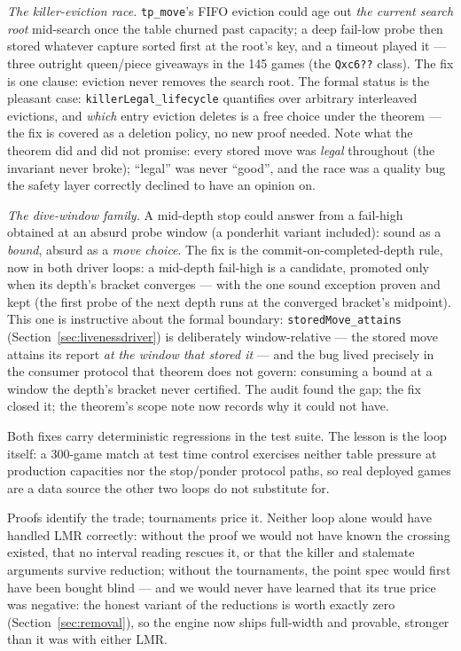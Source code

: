 \documentclass[11pt]{article}
\theoremstyle{plain}
\theoremstyle{definition}
\theoremstyle{remark}
\begin{document}
\emph{The killer-eviction race.}  \texttt{tp\_move}'s FIFO eviction
could age out \emph{the current search root} mid-search once the table
churned past capacity; a deep fail-low probe then stored whatever
capture sorted first at the root's key, and a timeout played it ---
three outright queen/piece giveaways in the 145 games (the
\texttt{Qxc6??} class).  The fix is one clause: eviction never removes
the search root.  The formal status is the pleasant case:
\texttt{killerLegal\_lifecycle} quantifies over arbitrary interleaved
evictions, and \emph{which} entry eviction deletes is a free choice
under the theorem --- the fix is covered as a deletion policy, no new
proof needed.  Note what the theorem did and did not promise: every
stored move was \emph{legal} throughout (the invariant never broke);
``legal'' was never ``good'', and the race was a quality bug the
safety layer correctly declined to have an opinion on.

\emph{The dive-window family.}  A mid-depth stop could answer from a
fail-high obtained at an absurd probe window (a ponderhit variant
included): sound as a \emph{bound}, absurd as a \emph{move choice}.
The fix is the commit-on-completed-depth rule, now in both driver
loops: a mid-depth fail-high is a candidate, promoted only when its
depth's bracket converges --- with the one sound exception proven and
kept (the first probe of the next depth runs at the converged
bracket's midpoint).  This one is instructive about the formal
boundary: \texttt{storedMove\_attains}
(Section~\ref{sec:livenessdriver}) is deliberately window-relative
--- the stored move attains its report \emph{at the window that
stored it} --- and the bug lived precisely in the consumer protocol
that theorem does not govern: consuming a bound at a window the
depth's bracket never certified.  The audit found the gap; the fix
closed it; the theorem's scope note now records why it could not have.

Both fixes carry deterministic regressions in the test suite.  The
lesson is the loop itself: a 300-game match at test time control
exercises neither table pressure at production capacities nor the
stop/ponder protocol paths, so real deployed games are a data source
the other two loops do not substitute for.

Proofs identify the trade; tournaments price it.  Neither loop alone
would have handled LMR correctly: without the proof we would not have
known the crossing existed, that no interval reading rescues it, or
that the killer and stalemate arguments survive reduction; without the
tournaments, the point spec would first have been bought blind --- and
we would never have learned that its true price was negative: the
honest variant of the reductions is worth exactly zero
(Section~\ref{sec:removal}), so the engine now ships full-width and
provable, stronger than it was with either LMR.
\end{document}

